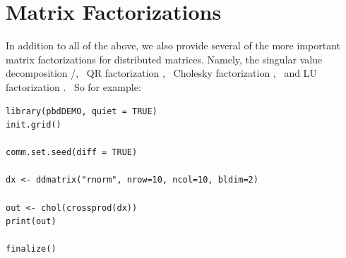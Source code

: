 \section{Matrix Factorizations}

In addition to all of the above, we also provide several of the more important matrix factorizations for distributed matrices.  Namely, the singular value decomposition
/,~
QR factorization ,~
Cholesky factorization ,~
and LU factorization .~
So for example:

\begin{lstlisting}[language=rr,title=Matrix Factorizations]
library(pbdDEMO, quiet = TRUE)
init.grid()

comm.set.seed(diff = TRUE)

dx <- ddmatrix("rnorm", nrow=10, ncol=10, bldim=2)

out <- chol(crossprod(dx))
print(out)

finalize()
\end{lstlisting}

